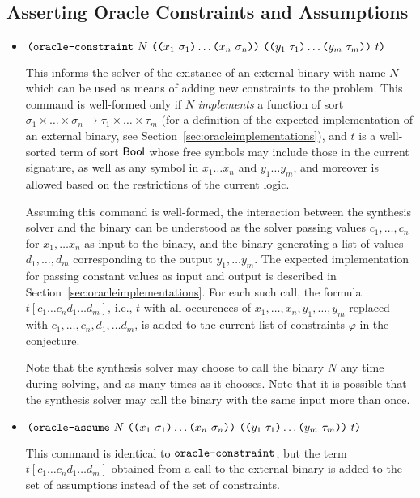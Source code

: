 \documentclass[english,a4paper,10pt]{article}
\begin{document}
\subsection{Asserting Oracle Constraints and Assumptions}
\begin{itemize}
\item $\texttt{(}\texttt{oracle-constraint}\mbox{ } N \mbox{ } 
\texttt{(}\texttt{(}x_1\mbox{ }\sigma_1\texttt{)} \ldots \texttt{(}x_n\mbox{ }\sigma_n\texttt{)}\texttt{)}\mbox{ }
\texttt{(}\texttt{(}y_{1}\mbox{ }\tau_{1}\texttt{)} \ldots \texttt{(}y_{m}\mbox{ }\tau_{m}\texttt{)}\texttt{)}  \mbox{ } t\texttt{)}$

This informs the solver of the existance of an external binary with name $N$
which can be used as means of adding new constraints to the problem.
This command is well-formed only if $N$
\emph{implements} a function of sort $\sigma_1 \times \ldots \times \sigma_n \rightarrow \tau_{1} \times \ldots \times \tau_{m}$
(for a definition of the expected implementation of an external binary, see Section~\ref{sec:oracleimplementations}),
and $t$ is a well-sorted term of sort $\mathsf{Bool}$ 
whose free symbols may include those in the current signature, as well as any symbol in $x_1 \ldots x_{n}$ and $y_1 \ldots y_{m}$,
and moreover is allowed based on the restrictions of the current logic.

Assuming this command is well-formed,
the interaction between the synthesis solver and the binary
can be understood as the solver passing values
$c_1, \ldots, c_n$ for $x_1, \ldots x_n$ as input to the binary,
and the binary generating a list of values
$d_{1}, \ldots, d_{m}$ corresponding to the output $y_{1}, \ldots y_{m}$.
The expected implementation for passing
constant values as input and output 
is described in Section~\ref{sec:oracleimplementations}.
For each such call,
the formula $t[c_1 \ldots c_{n} d_1 \ldots d_m]$, i.e., 
$t$ with all occurences of $x_1, \ldots, x_{n}, y_1, \ldots, y_m$ replaced with $c_1, \ldots, c_{n}, d_1, \ldots d_m$, 
is added to the current list of constraints $\varphi$ in the conjecture.

Note that 
the synthesis solver may choose to call the binary $N$ 
any time during solving, and as many times as it chooses.
Note that it is possible that the synthesis solver may call the binary with
the same input more than once.

\item 
$\texttt{(}\texttt{oracle-assume}\mbox{ } N \mbox{ } 
\texttt{(}\texttt{(}x_1\mbox{ }\sigma_1\texttt{)} \ldots \texttt{(}x_n\mbox{ }\sigma_n\texttt{)}\texttt{)}\mbox{ }
\texttt{(}\texttt{(}y_{1}\mbox{ }\tau_{1}\texttt{)} \ldots \texttt{(}y_{m}\mbox{ }\tau_{m}\texttt{)}\texttt{)}  \mbox{ } t\texttt{)}$

This command is identical to $\texttt{oracle-constraint}$,
but the term $t[c_1 \ldots c_{n} d_1 \ldots d_m]$ obtained from a call to the external binary
is added to the set of assumptions instead of the set of constraints.

\end{itemize}
\end{document}
